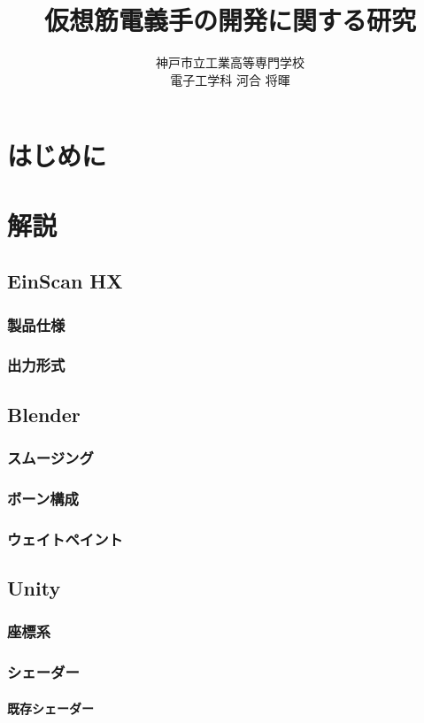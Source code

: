 \documentclass[report]{ltjsbook}
\title{仮想筋電義手の開発に関する研究}
\author{神戸市立工業高等専門学校 \\ 電子工学科 河合 将暉}
\begin{document}
\maketitle

\setcounter{tocdepth}{3}
\tableofcontents
\clearpage

\chapter{はじめに}

\chapter{解説}
	\section{EinScan HX}
		\subsection{製品仕様}
		\subsection{出力形式}
	\section{Blender}
		\subsection{スムージング}
		\subsection{ボーン構成}
		\subsection{ウェイトペイント}
	\section{Unity}
		\subsection{座標系}
		\subsection{シェーダー}
			\subsubsection{既存シェーダー}
\end{document}
